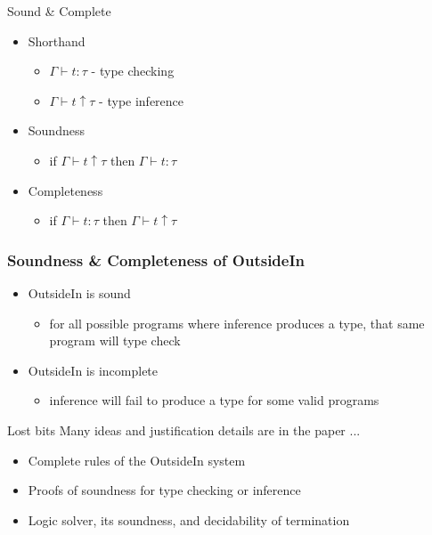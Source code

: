 \documentclass{beamer}
\begin{document}
\begin{frame}{Sound \& Complete}
\begin{itemize}
\item Shorthand
   \begin{itemize}
   \item $\Gamma \vdash t : \tau$ - type checking
   \item $\Gamma \vdash t \uparrow \tau$ - type inference
   \end{itemize}
\item Soundness
   \begin{itemize}
   \item if $\Gamma \vdash t \uparrow \tau$ then $\Gamma \vdash t : \tau$
   \end{itemize}
\item Completeness
   \begin{itemize}
   \item if $\Gamma \vdash t : \tau$ then $\Gamma \vdash t \uparrow \tau$
   \end{itemize}
\end{itemize}
\end{frame}

\begin{frame}
\frametitle{Soundness \& Completeness of OutsideIn}
\begin{itemize}
   \item OutsideIn is sound
      \begin{itemize}
         \item for all possible programs where inference produces a type, that same program will type check
      \end{itemize}
   \item OutsideIn is incomplete
      \begin{itemize}
         \item inference will fail to produce a type for some valid programs
      \end{itemize}
\end{itemize}
\end{frame}


\begin{frame}{Lost bits}
Many ideas and justification details are in the paper ...
\begin{itemize}
\item Complete rules of the OutsideIn system 
\item Proofs of soundness for type checking or inference
\item Logic solver, its soundness, and decidability of termination 
\end{itemize}
\end{frame}
\end{document}
